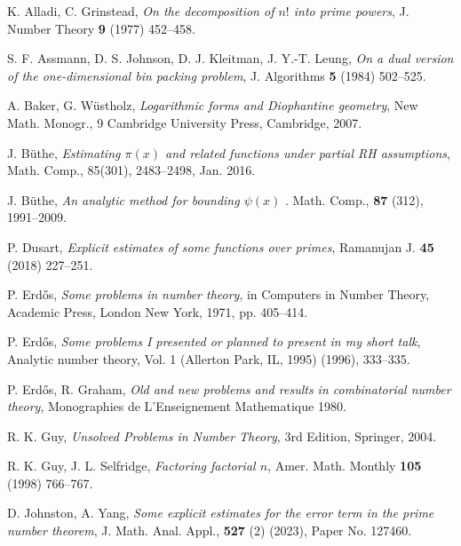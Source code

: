 \documentclass[12pt,a4paper,reqno]{amsart}
\numberwithin{equation}{section}
\theoremstyle{plain}
\theoremstyle{definition}
\begin{document}
\begin{thebibliography}{10}

  
K. Alladi, C. Grinstead, \emph{On the decomposition of $n!$ into prime powers}, J. Number Theory \textbf{9} (1977) 452--458.

S. F. Assmann, D. S. Johnson, D. J. Kleitman, J. Y.-T. Leung, \emph{On a dual version of the one-dimensional bin packing problem}, J. Algorithms \textbf{5} (1984) 502--525.

A. Baker, G. W\"ustholz, \emph{Logarithmic forms and Diophantine geometry}, New Math. Monogr., 9 Cambridge University Press, Cambridge, 2007.

J. B\"uthe, \emph{Estimating $\pi(x)$ and related functions under partial RH assumptions}, Math. Comp., 85(301), 2483--2498, Jan. 2016.

J. B\"uthe, \emph{An analytic method for bounding $\psi(x)$
}. Math. Comp., \textbf{87} (312), 1991--2009.




P. Dusart, \emph{Explicit estimates of some functions over primes}, Ramanujan J. \textbf{45} (2018) 227--251.

P. Erd\H{o}s, \emph{Some problems in number theory}, in Computers in Number Theory, Academic Press, London New York, 1971, pp. 405--414.

P. Erd\H{o}s, \emph{Some problems I presented or planned to present in my short talk}, Analytic number theory, Vol. 1 (Allerton Park, IL, 1995) (1996), 333--335.

P. Erd\H{o}s, R. Graham, \emph{Old and new problems and results in combinatorial number theory}, Monographies de L'Enseignement Mathematique 1980.

R. K. Guy, \emph{Unsolved Problems in Number Theory}, 3rd Edition, Springer, 2004.

R. K. Guy, J. L. Selfridge, \emph{Factoring factorial $n$}, Amer. Math. Monthly \textbf{105} (1998) 766--767.

D. Johnston, A. Yang, \emph{Some explicit estimates for the error term in the prime number theorem}, J. Math. Anal. Appl., \textbf{527} (2) (2023), Paper No. 127460.


\end{thebibliography}
\end{document}
